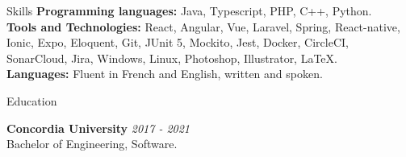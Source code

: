 \documentclass[10pt]{resume} %
\begin{document}
\begin{rSection}{Skills}
{\bf Programming languages:}
Java, Typescript, PHP, C++, Python.\\
{\bf Tools and Technologies:}
React, Angular, Vue, Laravel, Spring, React-native, Ionic, Expo, Eloquent, Git, JUnit 5, Mockito, Jest, Docker, CircleCI, SonarCloud, Jira, Windows, Linux, Photoshop, Illustrator, LaTeX. \\
{\bf Languages:}
Fluent in French and English, written and spoken.
\end{rSection}

\begin{rSection}{Education}

{\bf Concordia University} \hfill {\em 2017 - 2021} 
\\ Bachelor of Engineering, Software.
\end{rSection}
\end{document}

